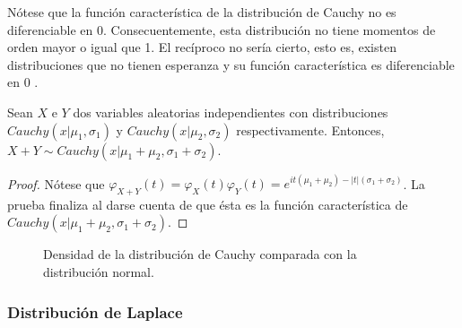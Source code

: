 Nótese que la función característica de la distribución de Cauchy no es diferenciable en $0$. Consecuentemente, esta distribución no tiene momentos de orden mayor o igual que 1. El recíproco no sería cierto, esto es, existen distribuciones que no tienen esperanza y su función característica es diferenciable en $0$ \cite{char}.

\begin{prop}
    Sean $X$ e $Y$ dos variables aleatorias independientes con distribuciones $Cauchy(x|\mu_1, \sigma_1)$ y $Cauchy(x|\mu_2, \sigma_2)$ respectivamente. Entonces, $X+Y \sim Cauchy(x|\mu_1+\mu_2,\sigma_1+\sigma_2)$.
\end{prop}
\begin{proof}
    Nótese que $\varphi_{X+Y}(t) = \varphi_{X}(t)\varphi_{Y}(t) = e^{it(\mu_1+\mu_2) - |t| (\sigma_1+\sigma_2)}$. La prueba finaliza al darse cuenta de que ésta es la función característica de $Cauchy(x|\mu_1+\mu_2,\sigma_1+\sigma_2)$.
\end{proof}

\begin{figure}[H]
    \caption{Densidad de la distribución de Cauchy comparada con la distribución normal.}
    \label{fig:cauchy}
\end{figure}


\subsubsection{Distribución de Laplace}

